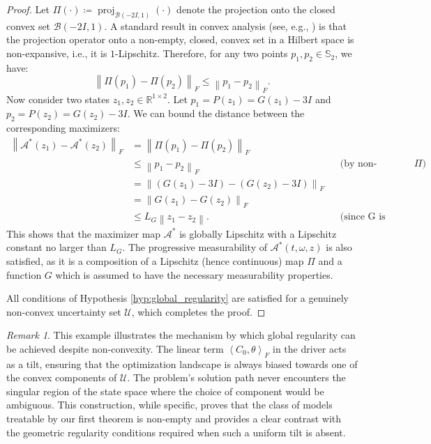 \documentclass[12pt, letterpaper]{amsart}
\newcommand{\Thetacal}{\mathcal{A}}
\newcommand{\Ucal}{\mathcal{U}}
\newcommand{\Bcal}{\mathcal{B}}
\newcommand{\R}{\mathbb{R}}
\newcommand{\norm}[1]{\left\lVert#1\right\rVert}
\newcommand{\scpr}[2]{\left\langle #1, #2 \right\rangle}
\DeclareMathOperator*{\proj}{proj}
\theoremstyle{plain}
\theoremstyle{definition}
\theoremstyle{remark}
\newtheorem{remark}[theorem]{Remark}
\numberwithin{equation}{section} %
\begin{document}
\begin{appendices}
\begin{proof}
Let \(\Pi(\cdot) \coloneqq \proj_{\Bcal(-2I, 1)}(\cdot)\) denote the projection onto the closed convex set \(\Bcal(-2I, 1)\). A standard result in convex analysis (see, e.g., \cite[Theorem 12.19]{RockafellarWets1998}) is that the projection operator onto a non-empty, closed, convex set in a Hilbert space is non-expansive, i.e., it is \(1\)-Lipschitz.
Therefore, for any two points \(p_1, p_2 \in \mathbb{S}_2\), we have:
\[
    \norm{\Pi(p_1) - \Pi(p_2)}_F \le \norm{p_1 - p_2}_F.
\]
Now consider two states \(z_1, z_2 \in \R^{1\times 2}\). Let \(p_1 = P(z_1) = G(z_1) - 3I\) and \(p_2 = P(z_2) = G(z_2) - 3I\). We can bound the distance between the corresponding maximizers:
\begin{align*}
    \norm{\Thetacal^*(z_1) - \Thetacal^*(z_2)}_F
    &= \norm{\Pi(p_1) - \Pi(p_2)}_F \\
    &\le \norm{p_1 - p_2}_F &&\text{(by non-expansiveness of \(\Pi\))} \\
    &= \norm{(G(z_1) - 3I) - (G(z_2) - 3I)}_F \\
    &= \norm{G(z_1) - G(z_2)}_F \\
    &\le L_G \norm{z_1 - z_2}. &&\text{(since G is globally Lipschitz)}
\end{align*}
This shows that the maximizer map \(\Thetacal^*\) is globally Lipschitz with a Lipschitz constant no larger than \(L_G\). The progressive measurability of \(\Thetacal^*(t, \omega, z)\) is also satisfied, as it is a composition of a Lipschitz (hence continuous) map \(\Pi\) and a function \(G\) which is assumed to have the necessary measurability properties.

All conditions of Hypothesis \ref{hyp:global_regularity} are satisfied for a genuinely non-convex uncertainty set \(\Ucal\), which completes the proof.
\end{proof}

\begin{remark}
This example illustrates the mechanism by which global regularity can be achieved despite non-convexity. The linear term \(\scpr{C_0}{\theta}_F\) in the driver acts as a tilt, ensuring that the optimization landscape is always biased towards one of the convex components of \(\Ucal\). The problem's solution path never encounters the singular region of the state space where the choice of component would be ambiguous. This construction, while specific, proves that the class of models treatable by our first theorem is non-empty and provides a clear contrast with the geometric regularity conditions required when such a uniform tilt is absent.
\end{remark}



\end{appendices}
\end{document}
